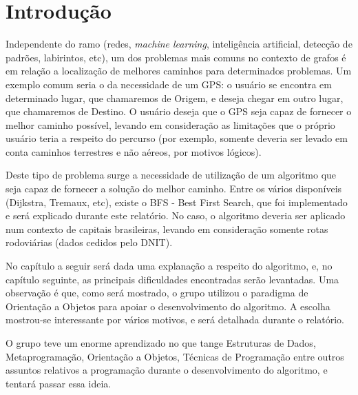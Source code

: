 \chapter[Introdução]{Introdução}

Independente do ramo (redes, \textit{machine learning}, inteligência artificial, detecção de padrões, labirintos, etc), um dos problemas mais comuns no contexto de grafos é em relação a localização de melhores caminhos para determinados problemas. Um exemplo comum seria o da necessidade de um GPS: o usuário se encontra em determinado lugar, que chamaremos de Origem, e deseja chegar em outro lugar, que chamaremos de Destino. O usuário deseja que o GPS seja capaz de fornecer o melhor caminho possível, levando em consideração as limitações que o próprio usuário teria a respeito do percurso (por exemplo, somente deveria ser levado em conta caminhos terrestres e não aéreos, por motivos lógicos).

Deste tipo de problema surge a necessidade de utilização de um algoritmo que seja capaz de fornecer a solução do melhor caminho. Entre os vários disponíveis (Dijkstra, Tremaux, etc), existe o BFS - Best First Search, que foi implementado e será explicado durante este relatório. No caso, o algoritmo deveria ser aplicado num contexto de capitais brasileiras, levando em consideração somente rotas rodoviárias (dados cedidos pelo DNIT).

No capítulo a seguir será dada uma explanação a respeito do algoritmo, e, no capítulo seguinte, as principais dificuldades encontradas serão levantadas. Uma observação é que, como será mostrado, o grupo utilizou o paradigma de Orientação a Objetos para apoiar o desenvolvimento do algoritmo. A escolha mostrou-se interessante por vários motivos, e será detalhada durante o relatório.

O grupo teve um enorme aprendizado no que tange Estruturas de Dados, Metaprogramação, Orientação a Objetos, Técnicas de Programação entre outros assuntos relativos a programação durante o desenvolvimento do algoritmo, e tentará passar essa ideia.